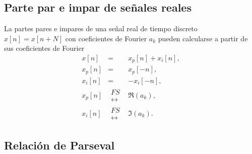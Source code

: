 \subsection{Parte par e impar de se\~{n}ales reales}

La partes pares e impares de una se\~{n}al real de tiempo discreto
$x[n] = x[n + N]$ con coeficientes de Fourier $a_{k}$ pueden calcularse a partir de sus coeficientes de Fourier
\begin{eqnarray}
x\left[ n\right] &=&x_{p}\left[ n\right] +x_i\left[ n\right] , \\
x_{p}\left[ n\right] &=&x_{p}\left[ -n\right] , \\
x_i\left[ n\right] &=&-x_i\left[ -n\right] , \\
x_{p}\left[ n\right] 
&\begin{array}{l}
FS \\ 
\longleftrightarrow
\end{array}&
\Re\left( a_{k}\right) , \\
x_i\left[ n\right] 
&\begin{array}{l}
FS \\ 
\longleftrightarrow
\end{array}&
\Im\left( a_{k}\right).
\end{eqnarray}

\subsection{Relaci\'{o}n de Parseval}

